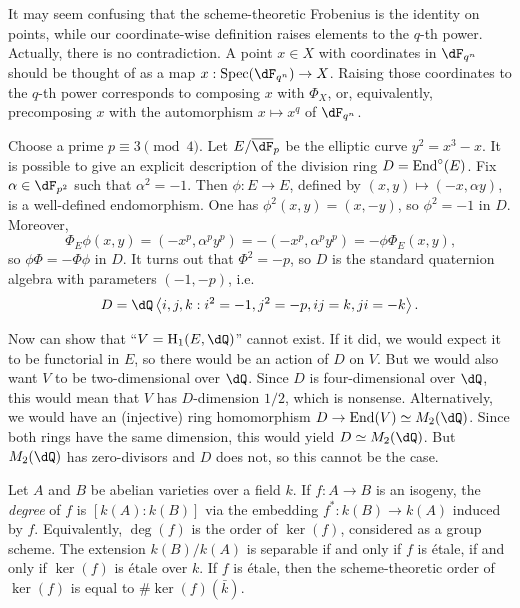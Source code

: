 It may seem confusing that the scheme-theoretic Frobenius is the identity on 
points, while our coordinate-wise definition raises elements to the $q$-th 
power. Actually, there is no contradiction. A point $x\in X$ with coordinates in 
$\dF_{q^n}$ should be thought of as a map $x:\spec(\dF_{q^n})\to X$. Raising 
those coordinates to the $q$-th power corresponds to composing $x$ with 
$\Phi_X$, or, equivalently, precomposing $x$ with the automorphism 
$x\mapsto x^q$ of $\dF_{q^n}$. 



\begin{example}[Serre]
Choose a prime $p\equiv 3\pmod 4$. Let $E/\overline\dF_p$ be the elliptic 
curve $y^2=x^3-x$. It is possible to give an explicit description of the 
division ring $D=\operatorname{End}^\circ(E)$. Fix $\alpha\in \dF_{p^2}$ such that 
$\alpha^2=-1$. Then $\phi:E\to E$, defined by $(x,y)\mapsto (-x,\alpha y)$, is 
a well-defined endomorphism. One has $\phi^2(x,y)=(x,-y)$, so $\phi^2=-1$ in 
$D$. Moreover, 
\[
  \Phi_E\phi(x,y) = (-x^p, \alpha^p y^p) = -(-x^p, \alpha^p y^p) = -\phi \Phi_E(x,y) \text{,}
\]
so $\phi \Phi=-\Phi \phi$ in $D$. It turns out that $\Phi^2=-p$, so $D$ is the 
standard quaternion algebra with parameters $(-1,-p)$, i.e.  
\[
  D = \dQ\left\langle i,j,k : i^2=-1,j^2=-p,i j=k, j i=-k\right\rangle \text{.}
\]
\end{example}

Now can show that ``$V=\h_1(E,\dQ)$'' cannot exist. If it did, we would expect 
it to be functorial in $E$, so there would be an action of $D$ on $V$. But we 
would also want $V$ to be two-dimensional over $\dQ$. Since $D$ is 
four-dimensional over $\dQ$, this would mean that $V$ has $D$-dimension $1/2$, 
which is nonsense. Alternatively, we would have an (injective) ring 
homomorphism $D\to \End(V)\simeq M_2(\dQ)$. Since both rings have the same 
dimension, this would yield $D\simeq M_2(\dQ)$. But $M_2(\dQ)$ has 
zero-divisors and $D$ does not, so this cannot be the case. 






Let $A$ and $B$ be abelian varieties over a field $k$. If $f:A\to B$ is an 
isogeny, the \emph{degree} of $f$ is $[k(A):k(B)]$ via the embedding 
$f^\ast:k(B) \to k(A)$ induced by $f$. Equivalently, $\deg(f)$ is the order 
of $\ker(f)$, considered as a group scheme. The extension $k(B)/k(A)$ is 
separable if and only if $f$ is \'etale, if and only if $\ker(f)$ is \'etale 
over $k$. If $f$ is \'etale, then the scheme-theoretic order of $\ker(f)$ is 
equal to $\# \ker (f)(\bar k)$. 

